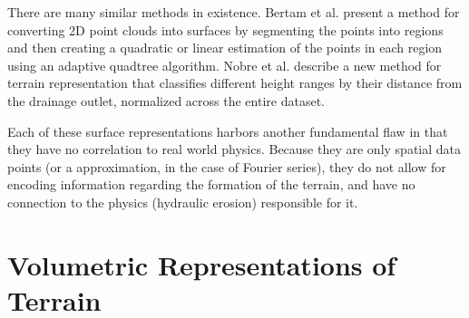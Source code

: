 There are many similar methods in existence. Bertam et al. \cite{Bertram:2003:ASS:769922.769942} present a method for converting 2D point clouds into surfaces by segmenting the points into regions and then creating a quadratic or linear estimation of the points in each region using an adaptive quadtree algorithm.  Nobre et al. \cite{Nobre_Cuartas_Hodnett_Rennó_Rodrigues_Silveira_Waterloo_Saleska_2011} describe a new method for terrain representation that classifies different height ranges by their distance from the drainage outlet, normalized across the entire dataset. 

Each of these surface representations harbors another fundamental flaw in that they have no correlation to real world physics. Because they are only spatial data points (or a approximation, in the case of Fourier series), they do not allow for encoding information regarding the formation of the terrain, and have no connection to the physics (hydraulic erosion) responsible for it.


\section{Volumetric Representations of Terrain}
\label{section:VolumetricRepresentations}

